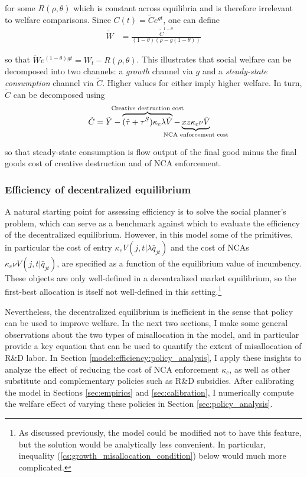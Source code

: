 \documentclass[11pt,english]{article}
\begin{document}
for some $R(\rho,\theta)$ which is constant across equilibria and is therefore irrelevant to welfare comparisons. Since $C(t) = \tilde{C}e^{gt}$, one can define
\begin{align}
	\tilde{W} &= \frac{\tilde{C}^{1-\theta}}{(1-\theta)(\rho - g(1-\theta))} \label{eq:agg_welfare1}
\end{align}

so that $\tilde{W} e^{(1-\theta)gt} = W_t - R(\rho,\theta)$. This illustrates that social welfare can be decomposed into two channels: a \textit{growth} channel via $g$ and a \textit{steady-state consumption} channel via $\tilde{C}$. Higher values for either imply higher welfare. In turn, $\tilde{C}$ can be decomposed using 
\begin{align}
	\tilde{C} &= \tilde{Y} - \overbrace{(\hat{\tau} + \tau^S) \kappa_e \lambda \tilde{V}}^{\mathclap{\text{Creative destruction cost}}} - \underbrace{x z \kappa_c \nu \tilde{V}}_{\mathclap{\text{NCA enforcement cost}}} \label{eq:agg_consumption_decomposition}
\end{align}

so that steady-state consumption is flow output of the final good minus the final goods cost of creative destruction and of NCA enforcement.

\subsubsection{Efficiency of decentralized equilibrium}

A natural starting point for assessing efficiency is to solve the social planner's problem, which can serve as a benchmark against which to evaluate the efficiency of the decentralized equilibrium. However, in this model some of the primitives, in particular the cost of entry $\kappa_e  V(j,t|\lambda \bar{q}_{jt})$ and the cost of NCAs $\kappa_c \nu V(j,t|\bar{q}_{jt})$, are specified as a function of the equilibrium value of incumbency. These objects are only well-defined in a decentralized market equilibrium, so the first-best allocation is itself not well-defined in this setting.\footnote{As discussed previously, the model could be modified not to have this feature, but the solution would be analytically less convenient. In particular, inequality (\ref{cs:growth_misallocation_condition}) below would much more complicated.} 

Nevertheless, the decentralized equilibrium is inefficient in the sense that policy can be used to improve welfare. In the next two sections, I make some general observations about the two types of misallocation in the model, and in particular provide a key equation that can be used to quantify the extent of misallocation of R\&D labor. In Section \ref{model:efficiency:policy_analysis}, I apply these insights to analyze the effect of reducing the cost of NCA enforcement $\kappa_c$, as well as other substitute and complementary policies such as R\&D subsidies. After calibrating the model in Sections \ref{sec:empirics} and \ref{sec:calibration}, I numerically compute the welfare effect of varying these policies in Section \ref{sec:policy_analysis}.
\end{document}
